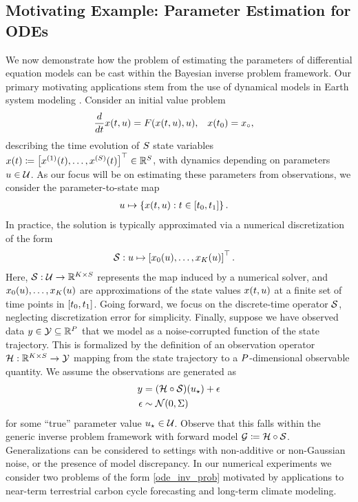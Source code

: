 \documentclass[12pt]{article}
\begin{document}
\subsection{Motivating Example: Parameter Estimation for ODEs} \label{dynamical_models}
We now demonstrate how the problem of estimating the parameters of differential equation models 
 can be cast within the Bayesian inverse problem framework. Our primary motivating applications 
 stem from the use of dynamical models in Earth system modeling  \citep{ESM_modeling_2pt0,paramLSM}.
Consider an initial value problem 
\begin{align}
\frac{d}{d\Time} \state(\Time, \Par) &= \odeRHS(\state(\Time, \Par), \Par), &&x(\timeStart) = \stateIC, \label{ode_ivp}
\end{align}
describing the time evolution of $\dimState$ state variables 
$\state(\Time) \Def \left[\indexState[1]{\state}(\Time), \dots, \indexState[\dimState]{\state}(\Time)\right]^\top \in \mathbb{R}^{\dimState}$,
with dynamics depending on parameters $\Par \in \parSpace$. As our focus will be on estimating these parameters 
from observations, we consider the parameter-to-state map
\begin{align}
\Par &\mapsto \left\{\state(\Time, \Par) :  \Time \in [\timeStart, \timeEnd] \right\}.
\end{align}
In practice, the solution is typically approximated via a numerical discretization of the form 
\begin{align}
\solutionOp: \Par &\mapsto \left[\indexTime[0]{\state}(\Par), \dots, \indexTime[\NTimeStep]{\state}(\Par) \right]^\top. \label{eq:ode-solution-op}
\end{align}
Here, $\solutionOp: \parSpace \to \R^{\NTimeStep \times \dimState}$ represents the map induced by a numerical solver, 
and $\indexTime[0]{\state}(\Par), \dots, \indexTime[\NTimeStep]{\state}(\Par)$ are approximations of the state 
values $\state(\Time, \Par)$ at a finite set of time points in $[\timeStart, \timeEnd]$. 
Going forward, we focus on the discrete-time operator $\solutionOp$, neglecting discretization error
for simplicity. Finally, suppose we have observed data $\obs \in \obsSpace \subseteq \R^{\dimObs}$ that we model as a
noise-corrupted function of the state trajectory. This is formalized by the definition of an observation operator 
$\obsOp: \R^{\NTimeStep \times \dimState} \to \obsSpace$ mapping from the state trajectory to a 
$\dimObs$-dimensional observable quantity. We assume the observations are generated as 
\begin{align}
\obs &= (\obsOp \circ \solutionOp)(\ParTrue) + \noise \label{ode_inv_prob} \\
\noise &\sim \Gaussian(0, \likPar) \nonumber 
\end{align}
for some ``true'' parameter value $\ParTrue \in \parSpace$. Observe that this falls within the generic 
inverse problem framework with forward model $\fwd \Def \obsOp \circ \solutionOp$. 
Generalizations can be considered to settings with non-additive or non-Gaussian noise, or the 
presence of model discrepancy. In our numerical experiments we consider two problems of the 
form \cref{ode_inv_prob} motivated by applications to near-term terrestrial carbon cycle forecasting and 
long-term climate modeling. 
\end{document}
